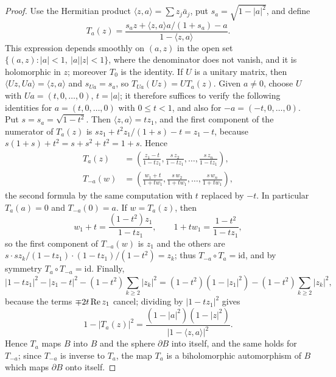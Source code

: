 \begin{proof}
Use the Hermitian product $\langle z,a\rangle=\sum z_j\bar a_j$, put $s_a=\sqrt{1-|a|^2}$, and define
\[
 T_a(z)=\frac{s_a z+\langle z,a\rangle a/(1+s_a)-a}
                       {1-\langle z,a\rangle}.
\]
This expression depends smoothly on $(a,z)$ in the open set $\{(a,z):|a|<1,\ |a||z|<1\}$, where the denominator does not vanish, and it is holomorphic in $z$; moreover $T_0$ is the identity. If $U$ is a unitary matrix, then $\langle Uz,Ua\rangle=\langle z,a\rangle$ and $s_{Ua}=s_a$, so $T_{Ua}(Uz)=UT_a(z)$. Given $a\ne0$, choose $U$ with $Ua=(t,0,\ldots,0)$, $t=|a|$; it therefore suffices to verify the following identities for $a=(t,0,\ldots,0)$ with $0\le t<1$, and also for $-a=(-t,0,\ldots,0)$. Put $s=s_a=\sqrt{1-t^2}$. Then $\langle z,a\rangle=tz_1$, and the first component of the numerator of $T_a(z)$ is $sz_1+t^2z_1/(1+s)-t=z_1-t$, because $s(1+s)+t^2=s+s^2+t^2=1+s$. Hence
\[
 \begin{aligned}
 T_a(z)&=\left(\frac{z_1-t}{1-tz_1},
           \frac{s\,z_2}{1-tz_1},\ldots,
           \frac{s\,z_n}{1-tz_1}\right),\\
 T_{-a}(w)&=\left(\frac{w_1+t}{1+tw_1},
           \frac{s\,w_2}{1+tw_1},\ldots,
           \frac{s\,w_n}{1+tw_1}\right),
 \end{aligned}
\]
the second formula by the same computation with $t$ replaced by $-t$. In particular $T_a(a)=0$ and $T_{-a}(0)=a$. If $w=T_a(z)$, then
\[
 w_1+t=\frac{(1-t^2)z_1}{1-tz_1},\qquad 1+tw_1=\frac{1-t^2}{1-tz_1},
\]
so the first component of $T_{-a}(w)$ is $z_1$ and the others are $s\cdot sz_k/(1-tz_1)\cdot(1-tz_1)/(1-t^2)=z_k$; thus $T_{-a}\circ T_a=\mathrm{id}$, and by symmetry $T_a\circ T_{-a}=\mathrm{id}$. Finally,
\[
 |1-tz_1|^2-|z_1-t|^2-(1-t^2)\sum_{k\ge2}|z_k|^2=(1-t^2)(1-|z_1|^2)-(1-t^2)\sum_{k\ge2}|z_k|^2,
\]
because the terms $\mp2t\operatorname{Re} z_1$ cancel; dividing by $|1-tz_1|^2$ gives
\[
 1-|T_a(z)|^2=\frac{(1-|a|^2)(1-|z|^2)}{|1-\langle z,a\rangle|^2}.
\]
Hence $T_a$ maps $B$ into $B$ and the sphere $\partial B$ into itself, and the same holds for $T_{-a}$; since $T_{-a}$ is inverse to $T_a$, the map $T_a$ is a biholomorphic automorphism of $B$ which maps $\partial B$ onto itself.


\end{proof}
